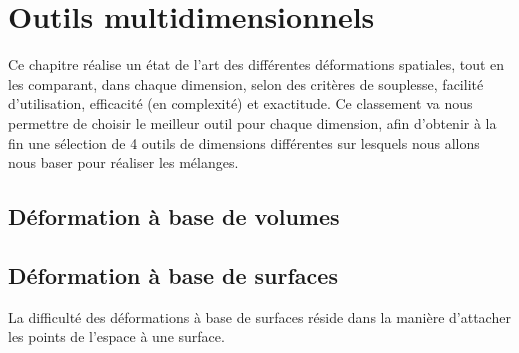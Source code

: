
\chapter{Outils multidimensionnels}

\graphicspath{{Chapter1/Chapter1Figs/PNG/}{Chapter1/Chapter1Figs/PDF/}{Chapter1/Chapter1Figs/}}

Ce chapitre réalise un état de l'art des différentes déformations
spatiales, tout en les comparant, dans chaque dimension, selon des critères
de souplesse, facilité d'utilisation, efficacité (en complexité) et
exactitude. Ce classement va nous permettre de choisir le meilleur
outil pour chaque dimension, afin d'obtenir à la fin une sélection de
4 outils de dimensions différentes sur lesquels nous allons nous baser
pour réaliser les mélanges.

\section{Déformation à base de volumes}

\section{Déformation à base de surfaces}
La difficulté des déformations à base de surfaces réside dans la
manière d'attacher les points de l'espace à une surface.

